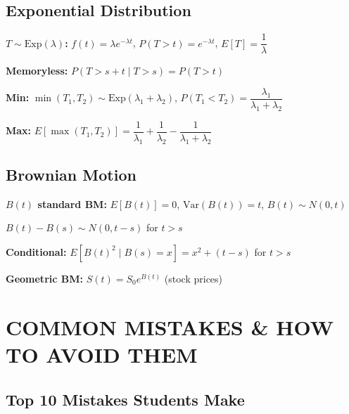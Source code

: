 \documentclass[10pt,letterpaper]{article}
\begin{document}
\subsection{Exponential Distribution}

\begin{tcolorbox}[colback=formulacolor!5,colframe=formulacolor]
\textbf{$T \sim \text{Exp}(\lambda)$:} $f(t) = \lambda e^{-\lambda t}$, \quad $P(T > t) = e^{-\lambda t}$, \quad $E[T] = \dfrac{1}{\lambda}$

\textbf{Memoryless:} $P(T > s+t \mid T > s) = P(T > t)$

\textbf{Min:} $\min(T_1, T_2) \sim \text{Exp}(\lambda_1 + \lambda_2)$, \quad $P(T_1 < T_2) = \dfrac{\lambda_1}{\lambda_1 + \lambda_2}$

\textbf{Max:} $E[\max(T_1, T_2)] = \dfrac{1}{\lambda_1} + \dfrac{1}{\lambda_2} - \dfrac{1}{\lambda_1 + \lambda_2}$
\end{tcolorbox}

\subsection{Brownian Motion}

\begin{tcolorbox}[colback=formulacolor!5,colframe=formulacolor]
\textbf{$B(t)$ standard BM:} $E[B(t)] = 0$, \quad $\text{Var}(B(t)) = t$, \quad $B(t) \sim N(0,t)$

$B(t) - B(s) \sim N(0, t-s)$ for $t > s$

\textbf{Conditional:} $E[B(t)^2 \mid B(s) = x] = x^2 + (t-s)$ for $t > s$

\textbf{Geometric BM:} $S(t) = S_0 e^{B(t)}$ (stock prices)
\end{tcolorbox}

\newpage

\section{COMMON MISTAKES \& HOW TO AVOID THEM}

\subsection{Top 10 Mistakes Students Make}
\end{document}
